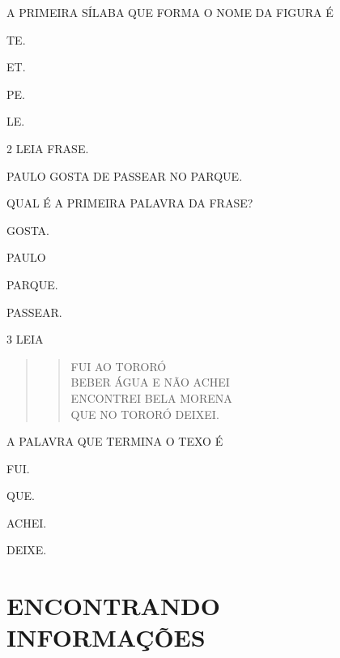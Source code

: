 A PRIMEIRA SÍLABA QUE FORMA O NOME DA FIGURA É

\begin{escolha}
\item TE.

\item ET.

\item PE.

\item LE.
\end{escolha}

\pagebreak

\num{2} LEIA FRASE.

\begin{myquote}
PAULO GOSTA DE PASSEAR NO PARQUE.
\end{myquote}

QUAL É A PRIMEIRA PALAVRA DA FRASE?

\begin{escolha}
\item GOSTA.

\item PAULO

\item PARQUE.

\item PASSEAR.
\end{escolha}


\num{3} LEIA

\begin{quote}
\begin{verse}
FUI AO TORORÓ\\
BEBER ÁGUA E NÃO ACHEI\\
ENCONTREI BELA MORENA\\
QUE NO TORORÓ DEIXEI.
\end{verse}
\end{quote}

A PALAVRA QUE TERMINA O TEXO É

\begin{escolha}
\item FUI.

\item QUE.

\item ACHEI.

\item DEIXE.
\end{escolha}

\chapter{ENCONTRANDO INFORMAÇÕES}

